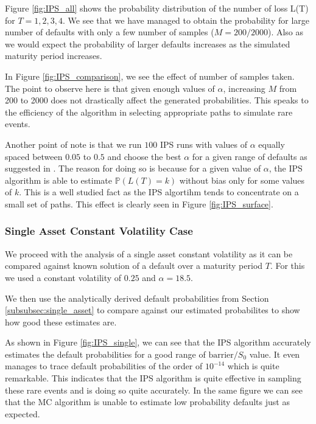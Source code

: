 Figure \ref{fig:IPS_all} shows the probability distribution of the number of
loss L(T) for $T = 1, 2, 3, 4$. We see that we have managed to obtain the
probability for large number of defaults with only a few number of samples ($M =
200/2000$). Also as we would expect the probability of larger defaults increases
as the simulated maturity period increases.

In Figure \ref{fig:IPS_comparison}, we see the effect of number of samples
taken. The point to observe here is that given enough values of $\alpha$, 
increasing $M$ from 200 to 2000 does not drastically affect the generated
probabilities. This speaks to the efficiency of the algorithm in selecting
appropriate paths to simulate rare events.

Another point of note is that we run $100$ IPS runs with values of $\alpha$
equally spaced between $0.05$ to $0.5$ and choose the best $\alpha$ for a given
range of defaults as suggested in \cite{carmona2009importance}. The reason for 
doing so is because for a given value of $\alpha$, the IPS algorithm is able to 
estimate $\mathbb{P}(L(T) = k)$ without bias only for some values of $k$. This
is a well studied fact as the IPS algortihm tends to concentrate on a small set
of paths. This effect is clearly seen in Figure \ref{fig:IPS_surface}.

\subsubsection{Single Asset Constant Volatility Case}
We proceed with the analysis of a single asset constant volatility as it can be
compared against known solution of a default over a maturity period $T$. For
this we used a constant volatility of $0.25$ and $\alpha = 18.5$.

We then use the analytically derived default probabilities from Section
\ref{subsubsec:single_asset} to compare against our estimated probabilites to
show how good these estimates are.

As shown in Figure \ref{fig:IPS_single},  we can see that the IPS algorithm
accurately estimates the default probabilities for a good range of
$\text{barrier}/S_0$ value. It even manages to trace default probabilities of the 
order of $10^{-14}$ which is quite remarkable. This indicates that the IPS
algorithm is quite effective in sampling these rare events and is doing so quite
accurately. In the same figure we can see that the MC algorithm is unable to
estimate low probability defaults just as expected.

